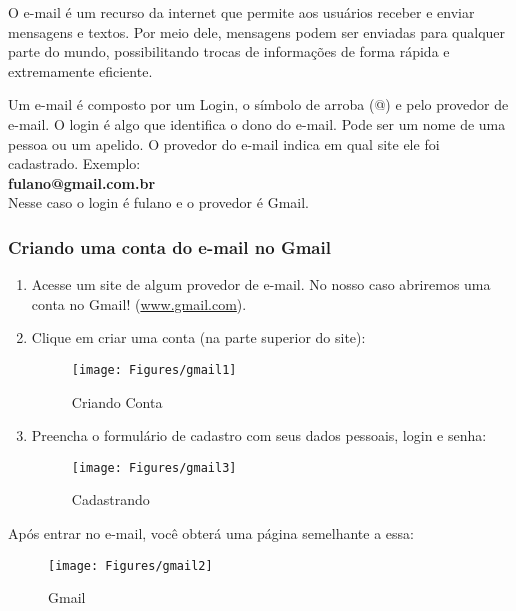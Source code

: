 \documentclass[hidelinks,12pt]{article}
\begin{document}
 O e-mail é um recurso da internet que permite aos usuários receber e enviar mensagens e textos. Por meio dele, mensagens podem ser enviadas para qualquer parte do mundo, possibilitando trocas de informações de forma rápida e extremamente eficiente.

Um e-mail é composto por um Login, o símbolo de arroba (@) e pelo provedor de e-mail. O login é algo que identifica o dono do e-mail. Pode ser um nome de uma pessoa ou um apelido. O provedor do e-mail indica em qual site ele foi cadastrado. Exemplo:\\

\hspace{3.7cm}\textbf{\large{fulano@gmail.com.br}}\\

Nesse caso o login é fulano e o provedor é Gmail.


\subsubsection{Criando uma conta do e-mail no Gmail}

\begin{enumerate}
	\item  Acesse um site de algum provedor de e-mail. No nosso caso abriremos uma conta no Gmail! (\url{www.gmail.com}).
	\item Clique em criar uma conta (na parte superior do site):
    	\begin{figure}[!h]
    		\centering
    		\texttt{[image: Figures/gmail1]}
    		\label{fig:gmail1}
    		\caption{Criando Conta}
    	\end{figure}

    \item  Preencha o formulário de cadastro com seus dados pessoais, login e senha:

        \begin{figure}[!h]
        	\centering
        	\texttt{[image: Figures/gmail3]}
        	\label{fig:gmail3}
        	\caption{Cadastrando}
        \end{figure}

\end{enumerate}

Após entrar no e-mail, você obterá uma página semelhante a essa:

\begin{figure}[!h]
	\centering
	\texttt{[image: Figures/gmail2]}
	\label{fig:gmail2}
	\caption{Gmail}
\end{figure}
\end{document}
